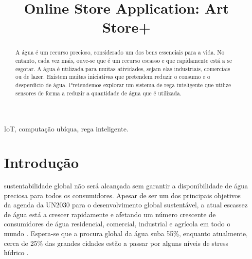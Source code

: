 \documentclass[conference]{IEEEtran}
\begin{document}
\title{Online Store Application: Art Store+}

\author{
\and
{}
\and
{}
}

\maketitle

\begin{abstract}
A água é um recurso precioso, considerado um dos bens essenciais para a vida.
No entanto, cada vez mais, ouve-se que é um recurso escasso e que rapidamente
está a se esgotar. A água é utilizada para muitas atividades, sejam elas industriais,
comerciais ou de lazer. Existem muitas iniciativas que pretendem reduzir o
consumo e o desperdício de água. Pretendemos explorar um sistema de rega
inteligente que utilize sensores de forma a reduzir a quantidade de água que
é utilizada. \\
\end{abstract}

\begin{IEEEkeywords}
IoT, computação ubíqua, rega inteligente.
\end{IEEEkeywords}

\section{Introdução}

 sustentabilidade global não será alcançada sem garantir a
disponibilidade de água preciosa para todos os consumidores. Apesar de ser um
dos principais objetivos da agenda da UN2030 \cite{un2015agenda} para o desenvolvimento
global sustentável, a atual escassez de água está a crescer rapidamente e
afetando um número crescente de consumidores de água residencial, comercial,
industrial e agrícola em todo o mundo \cite{mishra2021water}. Espera-se que a
procura global da água suba 55\%, enquanto atualmente, cerca de 25\% das grandes
cidades estão a passar por alguns níveis de stress hídrico \cite{josefine2021differentiated}.
\end{document}
